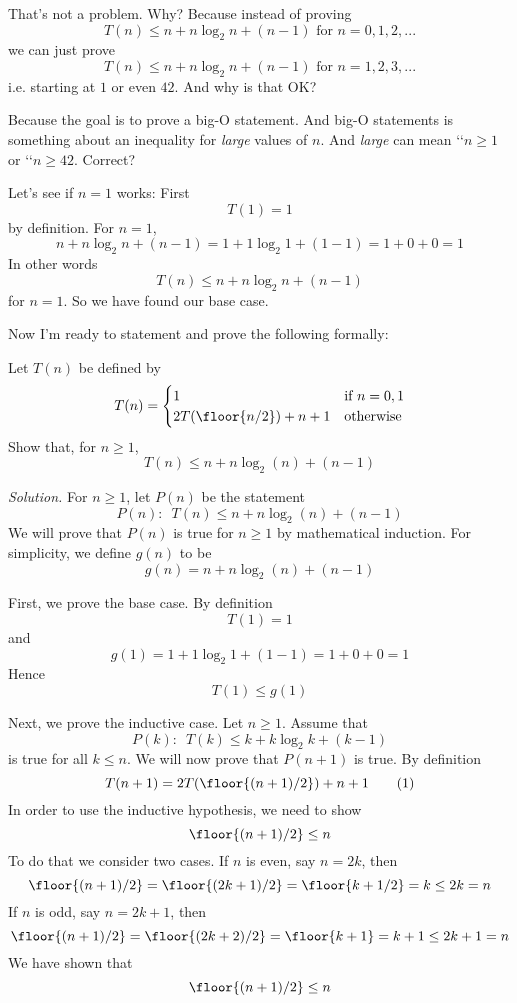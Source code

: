 That's not a problem. 
Why?
Because instead of proving 
\[
T(n) \leq n + n \log_2 n + (n - 1) \text{ for $n = 0, 1, 2, ...$}
\]
we can just prove 
\[
T(n) \leq n + n \log_2 n + (n - 1) \text{ for $n = 1, 2, 3, ...$}
\]
i.e. starting at $1$ or even $42$.
And why is that OK?

Because the goal is to prove a big-O statement.
And big-O statements is something about an inequality for
\textit{large} values of $n$.
And \textit{large} can mean 
\lq\lq$n \geq 1$ or
\lq\lq$n \geq 42$.
Correct?

Let's see if $n = 1$ works:
First
\[
T(1) = 1
\]
by definition.
For $n = 1$, 
\[
n + n \log_2 n + (n - 1) = 1 + 1 \log_2 1 + (1 - 1) = 1 + 0 + 0 = 1
\]
In other words
\[
T(n) \leq n + n \log_2 n + (n - 1)
\]
for $n = 1$.
So we have found our base case.

Now I'm ready to statement and prove the following formally:

\newpage

\begin{eg}
Let $T(n)$ be defined by 
\[
T(n) = 
\begin{cases}
1                       & \text{if $n = 0, 1$} \\
2T(\floor{n/2}) + n + 1 & \text{otherwise}
\end{cases}
\]
Show that, for $n \geq 1$,
\[
T(n) \leq n + n \log_2(n) + (n - 1)
\]
\end{eg}

\textit{Solution.}
For $n \geq 1$, let $P(n)$ be the statement
\[
P(n): \,\,\, T(n) \leq n + n \log_2(n) + (n - 1)
\]
We will prove that $P(n)$ is true for $n \geq 1$ by mathematical 
induction. 
For simplicity, we define $g(n)$ to be
\[
g(n) = n + n \log_2(n) + (n - 1)
\]

First, we prove the base case.
By definition
\[
T(1) = 1
\]
and
\[
g(1) = 1 + 1 \log_2 1 + (1 - 1) = 1 + 0 + 0 = 1
\]
Hence
\[
T(1) \leq g(1)
\]

Next, we prove the inductive case.
Let $n \geq 1$.
Assume that 
\[
P(k): \,\,\, T(k) 
\leq 
k
+ k \log_2 k 
+ (k - 1) 
\]
is true for all $k \leq n$.
We will now prove that $P(n+1)$ is true.
By definition
\[
T(n + 1) = 2 T(\floor{(n+1)/2}) + n + 1 \tag{1}
\]
In order to use the inductive hypothesis, 
we need to show 
\[
\floor{(n+1)/2} \leq n
\]
To do that we consider two cases.
If $n$ is even, say $n = 2k$, then
\[
\floor{(n+1)/2} = \floor{(2k + 1)/2} = \floor{k + 1/2} = k \leq 2k = n
\]
If $n$ is odd, say $n = 2k + 1$, then
\[
\floor{(n+1)/2} = \floor{(2k + 2)/2} = \floor{k + 1} = k + 1 \leq 2k + 1 = n
\]
We have shown that 
\[
\floor{(n+1)/2} \leq n
\]

